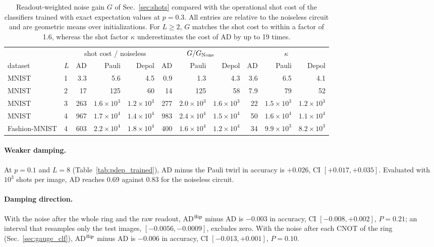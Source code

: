\documentclass[
 aps,pra,
 twocolumn,
 superscriptaddress,
 longbibliography,
 nofootinbib
]{revtex4-2}
\begin{document}
\begin{table}[t]
\caption{Readout-weighted noise gain $G$ of Sec.~\ref{sec:shots} compared with the
operational shot cost of the classifiers trained with exact expectation values at
$p=0.3$. All entries are relative to the noiseless circuit and are geometric means
over initializations. For $L\ge2$, $G$ matches the shot cost to within a factor of
1.6, whereas the shot factor $\kappa$ underestimates the cost of AD by up to 19 times.}
\label{tab:gain}
\begin{ruledtabular}
\begin{tabular}{llrrrrrrrrr}
 & & \multicolumn{3}{c}{shot cost / noiseless} & \multicolumn{3}{c}{$G/G_{\rm None}$} & \multicolumn{3}{c}{$\kappa$}\\
dataset & $L$ & AD & Pauli & Depol & AD & Pauli & Depol & AD & Pauli & Depol\\
\colrule
MNIST & 1 & 3.3 & 5.6 & 4.5 & 0.9 & 1.3 & 4.3 & 3.6 & 6.5 & 4.1\\
MNIST & 2 & 17 & 125 & 60 & 14 & 125 & 58 & 7.9 & 79 & 52\\
MNIST & 3 & 263 & $1.6\times10^3$ & $1.2\times10^3$ & 277 & $2.0\times10^3$ & $1.6\times10^3$ & 22 & $1.5\times10^3$ & $1.2\times10^3$\\
MNIST & 4 & 967 & $1.7\times10^4$ & $1.4\times10^4$ & 983 & $2.4\times10^4$ & $1.5\times10^4$ & 50 & $1.6\times10^4$ & $1.1\times10^4$\\
Fashion-MNIST & 4 & 603 & $2.2\times10^4$ & $1.8\times10^4$ & 400 & $1.6\times10^4$ & $1.2\times10^4$ & 34 & $9.9\times10^3$ & $8.2\times10^3$\\
\end{tabular}
\end{ruledtabular}
\end{table}

\paragraph{Weaker damping.}
At $p=0.1$ and $L=8$ (Table~\ref{tab:pdep_trained}), AD minus the Pauli twirl
in accuracy is $+0.026$, CI $[+0.017,+0.035]$. Evaluated with $10^3$ shots per
image, AD reaches 0.69 against 0.83 for the noiseless circuit.

\paragraph{Damping direction.}
With the noise after the whole ring and the raw readout, AD$^{\rm flip}$ minus AD is
$-0.003$ in accuracy, CI $[-0.008,+0.002]$, $P=0.21$; an interval that
resamples only the test images, $[-0.0056,-0.0009]$, excludes zero. With the
noise after each CNOT of the ring (Sec.~\ref{sec:gauge_clf}), AD$^{\rm flip}$
minus AD is $-0.006$ in accuracy, CI $[-0.013,+0.001]$, $P=0.10$.
\end{document}

